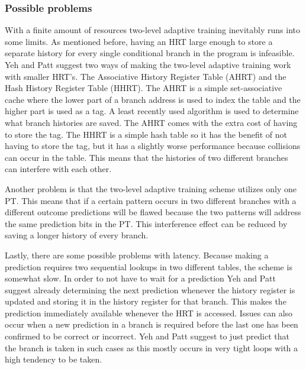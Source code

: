 \subsubsection{Possible problems}
With a finite amount of resources two-level adaptive training inevitably runs into some limits.
As mentioned before, having an HRT large enough to store a separate history for every single conditional branch in the program is infeasible.
Yeh and Patt suggest two ways of making the two-level adaptive training work with smaller HRT's.
The Associative History Register Table (AHRT) and the Hash History Register Table (HHRT).
The AHRT is a simple set-associative cache where the lower part of a branch address is used to index the table and the higher part is used as a tag.
A least recently used algorithm is used to determine what branch histories are saved.
The AHRT comes with the extra cost of having to store the tag.
The HHRT is a simple hash table so it has the benefit of not having to store the tag, but it has a slightly worse performance because collisions can occur in the table.
This means that the histories of two different branches can interfere with each other.

Another problem is that the two-level adaptive training scheme utilizes only one PT.
This means that if a certain pattern occurs in two different branches with a different outcome predictions will be flawed because the two patterns will address the same prediction bits in the PT.
This interference effect can be reduced by saving a longer history of every branch.

Lastly, there are some possible problems with latency.
Because making a prediction requires two sequential lookups in two different tables, the scheme is somewhat slow.
In order to not have to wait for a prediction Yeh and Patt suggest already determining the next prediction whenever the history register is updated and storing it in the history register for that branch.
This makes the prediction immediately available whenever the HRT is accessed.
Issues can also occur when a new prediction in a branch is required before the last one has been confirmed to be correct or incorrect.
Yeh and Patt suggest to just predict that the branch is taken in such cases as this mostly occurs in very tight loops with a high tendency to be taken.